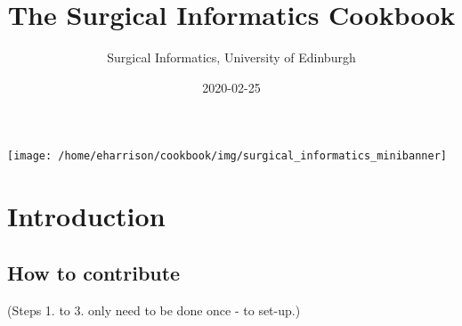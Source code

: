 \documentclass[]{book}
\title{The Surgical Informatics Cookbook}
\author{Surgical Informatics, University of Edinburgh}
\date{2020-02-25}
\begin{document}
\maketitle

{
\setcounter{tocdepth}{1}
\tableofcontents
}
\hypertarget{section}{%
\chapter*{}\label{section}}

\texttt{[image: /home/eharrison/cookbook/img/surgical\_informatics\_minibanner]}

\hypertarget{intro}{%
\chapter{Introduction}\label{intro}}

\hypertarget{how-to-contribute}{%
\section{How to contribute}\label{how-to-contribute}}

(Steps 1. to 3. only need to be done once - to set-up.)
\end{document}
